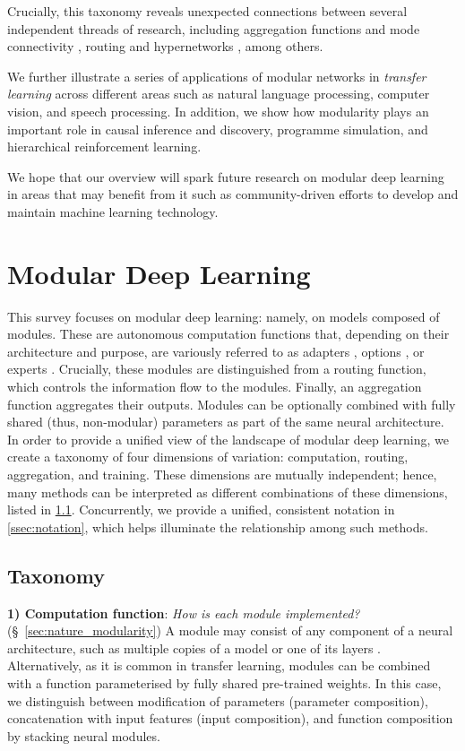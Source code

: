\documentclass[10pt]{article} %
\begin{document}
Crucially, this taxonomy reveals unexpected connections between several independent threads of research, including aggregation functions and mode connectivity \citep{Frankle2020LinearModeConnect}, routing and hypernetworks \citep{Ha2017HyperNetworks}, among others. 
 
We further illustrate a series of applications of modular networks in \textit{transfer learning} across different areas such as natural language processing, computer vision, and speech processing. In addition, we show how modularity plays an important role in causal inference and discovery, programme simulation, and hierarchical reinforcement learning.
 
We hope that our overview will spark future research on modular deep learning in areas that may benefit from it such as community-driven efforts to develop and maintain machine learning technology.  

\section{Modular Deep Learning}
 

This survey focuses on modular deep learning: namely, on models composed of modules. These are autonomous computation functions that, depending on their architecture and purpose, are variously referred to as adapters \citep{Rebuffi2017Adapters1,pfeiffer-etal-2020-adapterhub}, options \citep{sutton1999between,precup2000temporal}, or experts \citep{jacobs1991task,Jordan1994Hierarchical}. Crucially, these modules are distinguished from a routing function, which controls the information flow to the modules. Finally, an aggregation function aggregates their outputs. Modules can be optionally combined with fully shared (thus, non-modular) parameters as part of the same neural architecture. In order to provide a unified view of the landscape of modular deep learning, we create a taxonomy of four dimensions of variation: computation, routing, aggregation, and training. These dimensions are mutually independent; hence, many methods can be interpreted as different combinations of these dimensions, listed in \cref{ssec:taxonomy}. Concurrently, we provide a unified, consistent notation in \cref{ssec:notation}, which helps illuminate the relationship among such methods.

\subsection{Taxonomy}
\label{ssec:taxonomy}
\textbf{1) Computation function}: \textit{How is each module implemented?} (\S~\ref{sec:nature_modularity})
A module may consist of any component of a neural architecture, such as multiple copies of a model \citep{jacobs1991task} or one of its layers \citep{fedus2021switch}. Alternatively, as it is common in transfer learning, modules can be combined with a function parameterised by fully shared pre-trained weights. 
In this case, we distinguish between modification of parameters (parameter composition), concatenation with input features (input composition), and function composition by stacking neural modules. 
\end{document}
